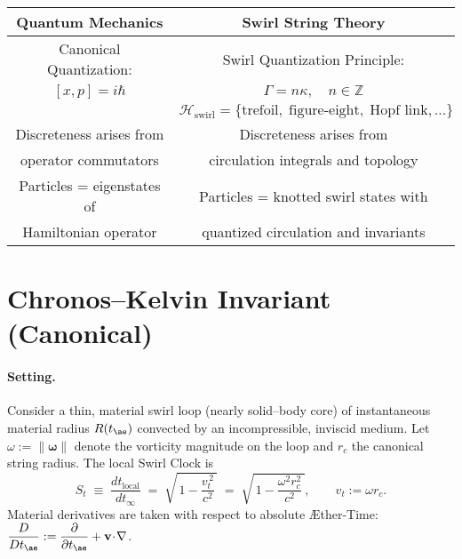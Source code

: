 \documentclass[11pt]{article}
\begin{document}
    \begin{center}
        \begin{tabular}{|c|c|}
            \hline
            \textbf{Quantum Mechanics} & \textbf{Swirl String Theory} \\
            \hline
            Canonical Quantization: & Swirl Quantization Principle: \\
            $[x, p] = i \hbar$ & $\Gamma = n \kappa, \quad n \in \mathbb{Z}$ \\[6pt]
            & $\mathcal{H}_\text{swirl} =
            \{ \text{trefoil}, \; \text{figure-eight}, \; \text{Hopf link}, \dots \}$ \\
            \hline
            Discreteness arises from & Discreteness arises from \\
            operator commutators & circulation integrals and topology \\
            \hline
            Particles = eigenstates of & Particles = knotted swirl states with \\
            Hamiltonian operator & quantized circulation and invariants \\
            \hline
        \end{tabular}
    \end{center}


    \section{Chronos–Kelvin Invariant (Canonical)}
    \label{sec:chronos_kelvin}

    \paragraph{Setting.}
    Consider a thin, material swirl loop (nearly solid–body core) of instantaneous material radius
    $R(t_{\ae})$ convected by an incompressible, inviscid medium. Let $\omega:=\|\boldsymbol{\omega}\|$ denote the
    vorticity magnitude on the loop and $r_c$ the canonical string radius. The local Swirl Clock is
    \begin{equation}
        S_t \;\equiv\; \frac{dt_{\text{local}}}{dt_\infty}
        \;=\;
        \sqrt{\,1-\frac{v_t^{\,2}}{c^2}\,}
        \;=\;
        \sqrt{\,1-\frac{\omega^2 r_c^2}{c^2}\,},\qquad v_t:=\omega r_c .
        \label{eq:SwirlClock-def}
    \end{equation}
    Material derivatives are taken with respect to absolute Æther-Time:
    $\displaystyle \frac{D}{Dt_{\ae}}:=\frac{\partial}{\partial t_{\ae}}+\mathbf{v}\!\cdot\!\nabla$.
\end{document}
